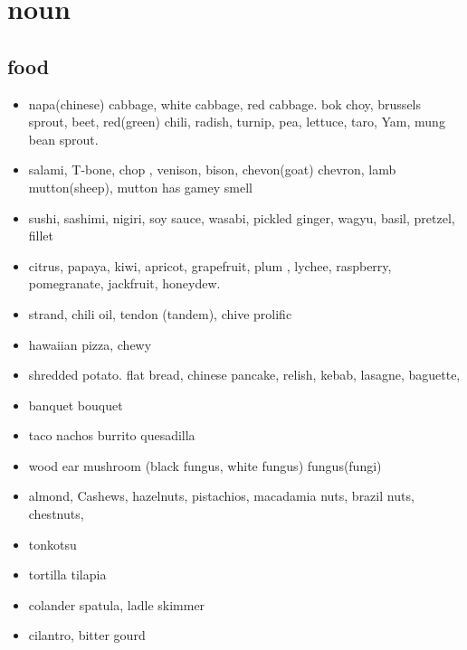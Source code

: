 \documentclass[a4paper,11pt,twoside]{book}
\begin{document}
\section{noun}
\subsection{food}
\begin{itemize}
	
	
	\item napa(chinese) cabbage, white cabbage, red cabbage. bok choy, brussels sprout, beet, red(green) chili, radish, turnip, pea, lettuce, taro, Yam, mung bean sprout. 
	
	\item salami, T-bone, chop , venison, bison, chevon(goat) chevron, lamb mutton(sheep), mutton has gamey smell
	
	\item sushi, sashimi, nigiri, soy sauce, wasabi, pickled ginger, wagyu, basil, pretzel, fillet
	
	\item citrus, papaya, kiwi, apricot, grapefruit, plum , lychee, raspberry, pomegranate,  jackfruit, honeydew.  
	
	\item strand, chili oil, tendon (tandem), chive prolific 
	
	\item hawaiian pizza, chewy
	
	\item shredded potato. flat bread, chinese pancake, relish, kebab, lasagne, baguette, 
	
	\item banquet bouquet
	
	\item taco nachos burrito quesadilla
	
	\item wood ear mushroom (black fungus, white fungus) fungus(fungi)
	
	\item almond, Cashews, hazelnuts, pistachios,  macadamia nuts, brazil nuts, chestnuts, 
	
	\item tonkotsu
	
	\item tortilla tilapia 
	
	\item colander spatula, ladle skimmer
	
	\item cilantro, bitter gourd 
	

\end{itemize}
\end{document}
